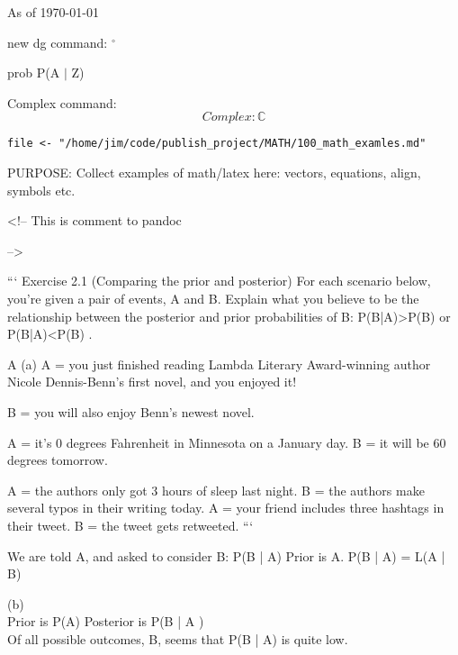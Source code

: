 \documentclass{article}
\newcommand{\dg}{^\circ}
\theoremstyle{definition}
\theoremstyle{remark}
\begin{document}
\newcommand{\bb}[1]{\mathbb{#1}}
\newcommand{\prob}[2]{P({#1} $\mid$ {#2})}
\newcommand{\define}[1]{\textbf{#1}}

 
As of \today

new dg command:  $\dg$



prob \prob{A}{Z}

Complex command:
$$
Complex: \bb{C}
$$

%






\begin{verbatim}
file <- "/home/jim/code/publish_project/MATH/100_math_examles.md"

\end{verbatim}
PURPOSE:	Collect examples of math/latex here:  vectors, equations, align,
symbols etc.

<!--	This is comment to pandoc


-->


```
Exercise 2.1 (Comparing the prior and posterior) For each scenario below, you’re given a pair of events, A
and B. Explain what you believe to be the relationship between the posterior and prior probabilities of B: P(B|A)>P(B) or P(B|A)<P(B)
.

    A
(a)
A = you just finished reading Lambda Literary Award-winning author Nicole Dennis-Benn’s first novel, and you enjoyed it! 

B = you will also enjoy Benn’s newest novel.

A = it’s 0 degrees Fahrenheit in Minnesota on a January day. 
B = it will be 60 degrees tomorrow.

A
= the authors only got 3 hours of sleep last night. B
= the authors make several typos in their writing today.
A
= your friend includes three hashtags in their tweet. B = the tweet gets retweeted. 
```


We are told A, and asked to consider B:  P(B | A)
Prior is A.
P(B | A) =  L(A | B)


(b) \\
Prior is P(A)  Posterior is P(B | A )\\
Of all possible outcomes, B, seems that P(B | A) is quite low.\\
\end{document}
